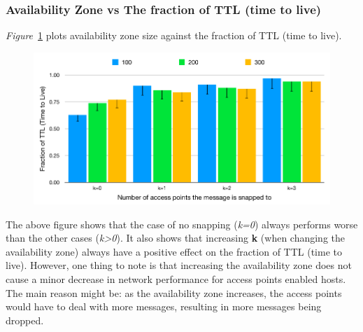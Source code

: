 {\subsubsection{Availability Zone vs The fraction of TTL (time to live)}
\emph{Figure}~\ref{fig:scenario2_3_availability_zone} plots availability zone size against the fraction of TTL (time to live).
\begin{figure}[H]
  \centering
  \includegraphics[scale=0.39]{./figures/scenario2_3_availability_zone}
  \label{fig:scenario2_3_availability_zone}
\end{figure}
The above figure shows that the case of no snapping (\textit{k=0}) always performs worse than the other cases (\textit{k>0}). It also shows that increasing \textbf{k} (when changing the availability zone) always have a positive effect on the fraction of TTL (time to live). However, one thing to note is that increasing the availability zone does not cause a minor decrease in network performance for access points enabled hosts. The main reason might be: as the availability zone increases, the access points would have to deal with more messages, resulting in more messages being dropped.
}
